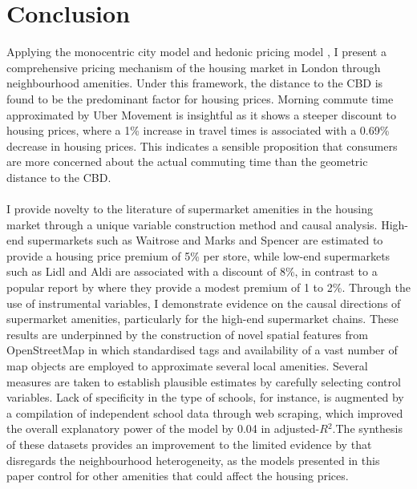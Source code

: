 \documentclass{article}
\begin{document}
\section{Conclusion} \label{section:conclusion}
Applying the monocentric city model \citep{AlonsoWilliam1964Lalu} and hedonic pricing model \citep{Rosen1984}, I present a comprehensive pricing mechanism of the housing market in London through neighbourhood amenities. Under this framework, the distance to the CBD is found to be the predominant factor for housing prices. Morning commute time approximated by Uber Movement is insightful as it shows a steeper discount to housing prices, where a 1\% increase in travel times is associated with a 0.69\% decrease in housing prices. This indicates a sensible proposition that consumers are more concerned about the actual commuting time than the geometric distance to the CBD.\\\\
I provide novelty to the literature of supermarket amenities in the housing market through a unique variable construction method and causal analysis. High-end supermarkets such as Waitrose and Marks and Spencer are estimated to provide a housing price premium of 5\% per store, while low-end supermarkets such as Lidl and Aldi are associated with a discount of 8\%, in contrast to a popular report by \citet{LloydsBank2016LivingHome} where they provide a modest premium of 1 to 2\%. Through the use of instrumental variables, I demonstrate evidence on the causal directions of supermarket amenities, particularly for the high-end supermarket chains. These results are underpinned by the construction of novel spatial features from OpenStreetMap in which standardised tags and availability of a vast number of map objects are employed to approximate several local amenities. Several measures are taken to establish plausible estimates by carefully selecting control variables. Lack of specificity in the type of schools, for instance, is augmented by a compilation of independent school data through web scraping, which improved the overall explanatory power of the model by 0.04 in adjusted-$R{^2}$.The synthesis of these datasets provides an improvement to the limited evidence by \citet{LloydsBank2016LivingHome} that disregards the neighbourhood heterogeneity, as the models presented in this paper control for other amenities that could affect the housing prices.\\\\
\end{document}
